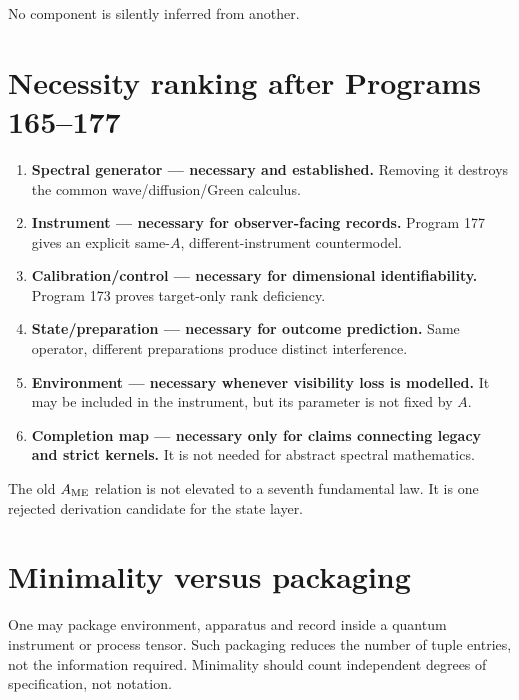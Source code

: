 \documentclass[11pt,a4paper,openany]{report}
\begin{document}
No component is silently inferred from another.

\section{Necessity ranking after Programs 165--177}

\begin{enumerate}
\item 
\textbf{Spectral generator --- necessary and established.} Removing it destroys the common wave/\allowbreak{}diffusion/\allowbreak{}Green calculus.

\item 
\textbf{Instrument --- necessary for observer-facing records.} Program 177 gives an explicit same-\(A\), different-instrument countermodel.

\item 
\textbf{Calibration/\allowbreak{}control --- necessary for dimensional identifiability.} Program 173 proves target-only rank deficiency.

\item 
\textbf{State/\allowbreak{}preparation --- necessary for outcome prediction.} Same operator, different preparations produce distinct interference.

\item 
\textbf{Environment --- necessary whenever visibility loss is modelled.} It may be included in the instrument, but its parameter is not fixed by \(A\).

\item 
\textbf{Completion map --- necessary only for claims connecting legacy and strict kernels.} It is not needed for abstract spectral mathematics.

\end{enumerate}

The old \(A_{\rm ME}\) relation is not elevated to a seventh fundamental law. It is one rejected derivation candidate for the state layer.

\section{Minimality versus packaging}

One may package environment, apparatus and record inside a quantum instrument or process tensor. Such packaging reduces the number of tuple entries, not the information required. Minimality should count independent degrees of specification, not notation.
\end{document}
